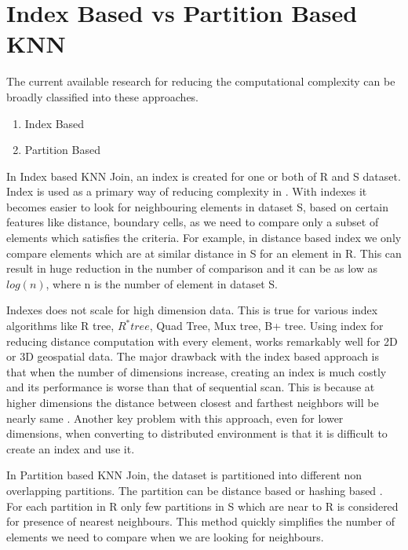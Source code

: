 \bigskip

\section{Index Based vs Partition Based KNN}
The current available research for reducing the computational
complexity can be broadly classified into these approaches.
\begin{enumerate}
\item Index Based
\item Partition Based
\end{enumerate}

\medskip

In Index based KNN Join, an index is created for one or both of R and S
dataset. Index is used as a primary way of reducing complexity in \cite{jagadish_idistance:_2005}
\cite{yu_efficient_2007} \cite{bohm_epsilon_2001}.  With indexes it
becomes easier to look for neighbouring elements in dataset S, based
on certain features like distance, boundary cells,  as we
need to compare only a subset of elements which satisfies the
criteria. For example, in distance based index
\cite{jagadish_idistance:_2005} we only compare elements which are at
similar distance in S for an element in R. This can result in huge
reduction in the number of comparison and it can be as low as $log(n)$, where n is the number of element in
dataset S.

\medskip

Indexes does not scale for high dimension data. This is true for various
index algorithms like R tree, $R^* tree$, Quad Tree, Mux tree, B+
tree. Using index for reducing distance computation with every element, works
remarkably well for 2D or 3D geospatial data. The major drawback with the
index based approach is that when the number of dimensions increase,
creating an index is much costly and its performance is worse than
that of sequential scan. This is because at higher dimensions the distance
between closest and farthest neighbors will be nearly same
\cite{beyer_when_1999}. Another key problem with this approach, even
for lower dimensions, when
converting to distributed environment is that it is difficult to
create an index and use it.

\bigskip

In Partition based KNN Join, the dataset is partitioned into different
non overlapping partitions. The
partition can be distance based\cite{lu_efficient_2012} or hashing
based \cite{stupar_rankreduceprocessing_2010} \cite{yao_k_2010}. For each partition in R only few partitions in S which are
near to R is considered for presence of nearest neighbours. This
method quickly simplifies the number of elements we need to
compare when we are looking for neighbours.

